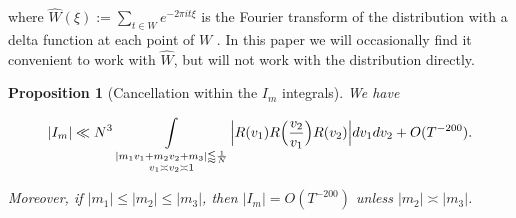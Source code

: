 \documentclass{amsart}
\theoremstyle{plain}
\newtheorem{prpstn}[thrm]{Proposition}
\numberwithin{equation}{section}
\begin{document}
where $\widehat{W}(\xi):=\sum_{t\in W}e^{-2\pi i t \xi}$ is the Fourier transform of the distribution with a delta function at each point of $W$ . In this paper we will occasionally find it convenient to work with $\widehat{W}$, but will not work with the distribution directly.



%
%

\begin{prpstn}[Cancellation within the $I_m$ integrals] \label{prpstnkeycancel} We have

\[
|I_m| \ll N^3  \mathop{\int}_{\substack{|m_1 v_1 + m_2 v_2 + m_3| \lessapprox \frac{1}{N}\\  v_1 \asymp v_2 \asymp 1}}  \Big| R(v_1)R\Bigl(\frac{v_2}{v_1}\Bigr)R(v_2 ) \Big| dv_1 dv_2 + O(T^{-200}).
\]

Moreover, if $|m_1|\le |m_2|\le |m_3|$, then $|I_m| = O(T^{-200})$ unless $|m_2| \asymp |m_3|$.  
\end{prpstn}
\end{document}
